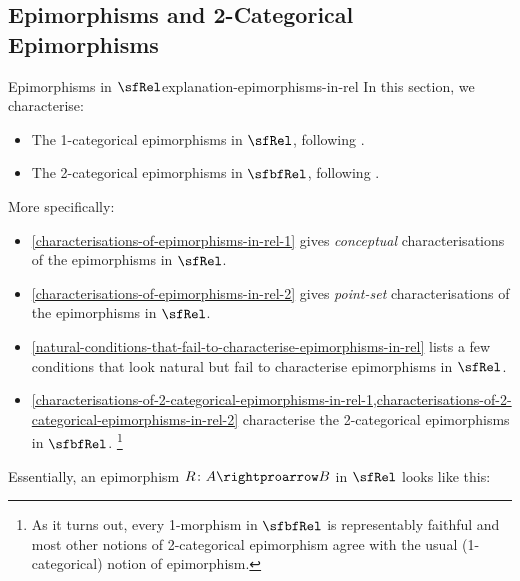 \subsection{Epimorphisms and 2-Categorical Epimorphisms}\label{subsection-epimorphisms-and-2-categorical-epimorphisms-in-rel}
\begin{explanation}{Epimorphisms in $\sfRel$}{explanation-epimorphisms-in-rel}%
    In this section, we characterise:
    \begin{itemize}
        \item The 1-categorical epimorphisms in $\sfRel$, following .
        \item The 2-categorical epimorphisms in $\sfbfRel$, following .
    \end{itemize}
    More specifically:
    \begin{itemize}
        \item \cref{characterisations-of-epimorphisms-in-rel-1}                       gives \emph{conceptual} characterisations of the epimorphisms in $\sfRel$.
        \item \cref{characterisations-of-epimorphisms-in-rel-2}                       gives \emph{point-set} characterisations of the epimorphisms in $\sfRel$.
        \item \cref{natural-conditions-that-fail-to-characterise-epimorphisms-in-rel} lists a few conditions that look natural but fail to characterise epimorphisms in $\sfRel$.
        \item \cref{characterisations-of-2-categorical-epimorphisms-in-rel-1,characterisations-of-2-categorical-epimorphisms-in-rel-2} characterise the 2-categorical epimorphisms in $\sfbfRel$.%
            \footnote{%
                As it turns out, every 1-morphism in $\sfbfRel$ is representably faithful and most other notions of 2-categorical epimorphism agree with the usual (1-categorical) notion of epimorphism.
                \par\vspace*{\TCBBoxCorrection}
            }%
    \end{itemize}
    Essentially, an epimorphism $R\colon A\rightproarrow B$ in $\sfRel$ looks like this:

\end{explanation}
